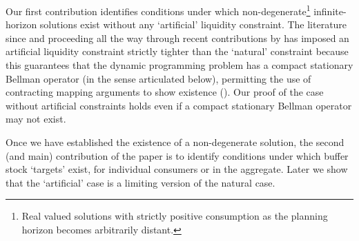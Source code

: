 \documentclass[BufferStockTheory]{subfiles}
\begin{document}

Our first contribution identifies conditions under which non-degenerate\footnote{Real valued solutions with strictly positive consumption as the planning horizon becomes arbitrarily distant.} infinite-horizon solutions exist without any `artificial' liquidity constraint.  The literature since \cite{bewleyPIH} and proceeding all the way through recent contributions by \cite{mstIncFluct,maUnboundedDP} has imposed an artificial liquidity constraint strictly tighter than the `natural' constraint because this guarantees that the dynamic programming problem has a compact stationary Bellman operator (in the sense articulated below), permitting the use of contracting mapping arguments to show existence (\cite{stachurski2022}).  Our proof of the case without artificial constraints holds even if a compact stationary Bellman operator may not exist.

Once we have established the existence of a non-degenerate solution, the second (and main) contribution of the paper is to identify conditions under which buffer stock `targets' exist, for individual consumers or in the aggregate.  Later we show that the `artificial' case is a limiting version of the natural case.



% 
\end{document}
